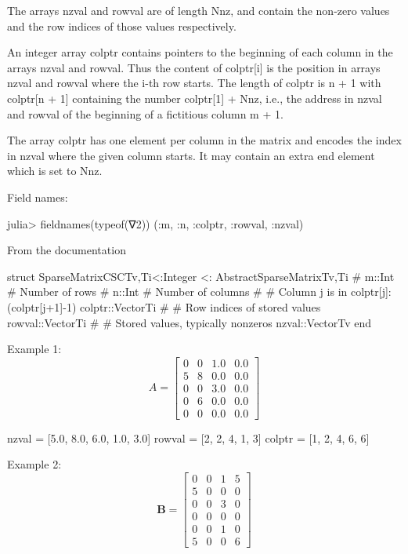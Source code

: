 The arrays nzval and rowval are of length Nnz, and contain the non-zero values
and the row indices of those values respectively.

An integer array colptr contains pointers to the beginning of each column in the
arrays nzval and rowval. Thus the content of colptr[i] is the position in
arrays nzval and rowval where the i-th row starts.
The length of colptr is n + 1 with colptr[n + 1] containing
the number colptr[1] + Nnz, i.e., the address in
nzval and rowval of the beginning of a
fictitious column m + 1.

The array colptr has one element per column in the matrix and encodes
the index in nzval where the given column starts. 
It may contain an extra end element which is set to Nnz.

Field names:
\begin{textcode}
julia> fieldnames(typeof(∇2))
(:m, :n, :colptr, :rowval, :nzval)  
\end{textcode}

From the documentation
\begin{fullwidth}
\begin{juliacode}
struct SparseMatrixCSC{Tv,Ti<:Integer} <: AbstractSparseMatrix{Tv,Ti}
    #
    m::Int  # Number of rows
    #
    n::Int  # Number of columns
    #
    # Column j is in colptr[j]:(colptr[j+1]-1)
    colptr::Vector{Ti}
    #
    # Row indices of stored values
    rowval::Vector{Ti}
    # # Stored values, typically nonzeros
    nzval::Vector{Tv}
end
\end{juliacode}
\end{fullwidth}

Example 1:
\begin{equation}
A = \begin{bmatrix}
0  &  0  &  1.0 &  0.0 \\
5  &  8  &  0.0 &  0.0 \\
0  &  0  &  3.0 &  0.0 \\
0  &  6  &  0.0 &  0.0 \\
0  &  0  &  0.0 &  0.0
\end{bmatrix}
\end{equation}

\begin{textcode}
nzval = [5.0, 8.0, 6.0, 1.0, 3.0]
rowval = [2, 2, 4, 1, 3]
colptr = [1, 2, 4, 6, 6]
\end{textcode}

Example 2:
\begin{equation}
\mathbf{B} = \begin{bmatrix}
0  &  0  &  1  &  5 \\
5  &  0  &  0  &  0 \\
0  &  0  &  3  &  0 \\
0  &  0  &  0  &  0 \\
0  &  0  &  1  &  0 \\
5  &  0  &  0  &  6
\end{bmatrix}
\end{equation}

